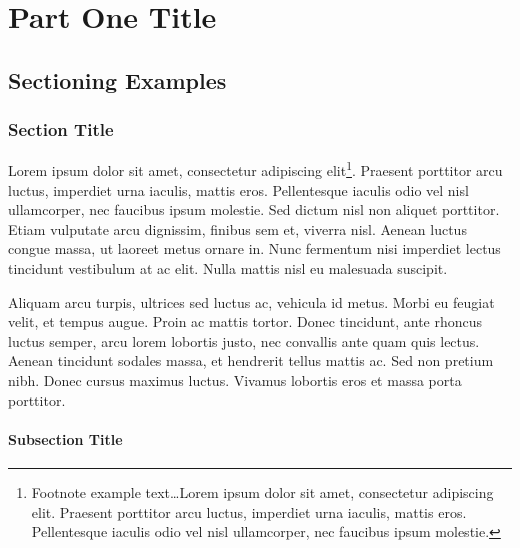 \documentclass[
	11pt,
	fleqn,
	a4paper,
]{LegrandOrangeBook}
\begin{document}
\part{Part One Title}



\chapterspaceabove{6.75cm} %
\chapterspacebelow{7.25cm} %


\chapter{Sectioning Examples}

\section{Section Title}

Lorem ipsum dolor sit amet, consectetur adipiscing elit\footnote{Footnote example text\ldots Lorem ipsum dolor sit amet, consectetur adipiscing elit. Praesent porttitor arcu luctus, imperdiet urna iaculis, mattis eros. Pellentesque iaculis odio vel nisl ullamcorper, nec faucibus ipsum molestie.}. Praesent porttitor arcu luctus, imperdiet urna iaculis, mattis eros. Pellentesque iaculis odio vel nisl ullamcorper, nec faucibus ipsum molestie. Sed dictum nisl non aliquet porttitor. Etiam vulputate arcu dignissim, finibus sem et, viverra nisl. Aenean luctus congue massa, ut laoreet metus ornare in. Nunc fermentum nisi imperdiet lectus tincidunt vestibulum at ac elit. Nulla mattis nisl eu malesuada suscipit.

Aliquam arcu turpis, ultrices sed luctus ac, vehicula id metus. Morbi eu feugiat velit, et tempus augue. Proin ac mattis tortor. Donec tincidunt, ante rhoncus luctus semper, arcu lorem lobortis justo, nec convallis ante quam quis lectus. Aenean tincidunt sodales massa, et hendrerit tellus mattis ac. Sed non pretium nibh. Donec cursus maximus luctus. Vivamus lobortis eros et massa porta porttitor.

\subsection{Subsection Title}
\end{document}

